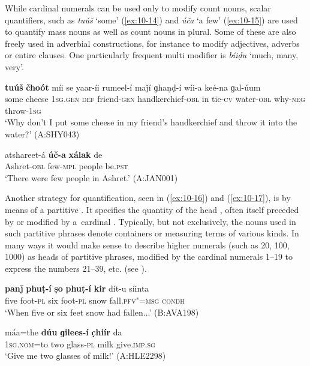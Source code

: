 While cardinal numerals can be used only to modify count nouns, scalar quantifiers, such as \textit{tuúš} `some' (\ref{ex:10-14}) and \textit{úča} `a few' (\ref{ex:10-15}) are used to quantify mass nouns as well as count nouns in plural. Some of these are also freely used in adverbial constructions, for instance to modify adjectives, adverbs or entire clauses. One particularly frequent multi modifier is \textit{bíiḍu} `much, many, very'.

\ea
\label{ex:10-14}
\gll \textbf{tuúš} \textbf{čhoót} míi se yaar-íi rumeel-í maǰí ɡhaṇḍ-í wíi-a keé-na ɡal-úum\\
some cheese \textsc{1sg.gen} \textsc{def} friend-\textsc{gen} handkerchief-\textsc{obl}  in tie-\textsc{cv} water-\textsc{obl} why-\textsc{neg} throw-\textsc{1sg} \\
\glt `Why don't I put some cheese in my friend's handkerchief and throw it into the water?' (A:SHY043)

\ex
\label{ex:10-15}
\gll atshareet-á \textbf{úč-a} \textbf{xálak} de \\
Ashret-\textsc{obl} few-\textsc{mpl} people be.\textsc{pst}\\
\glt `There were few people in Ashret.' (A:JAN001)
\z


Another strategy for quantification, seen in (\ref{ex:10-16}) and (\ref{ex:10-17}), is by means of a partitive  . It specifies the quantity of the head , often itself preceded by or modified by a~cardinal . Typically, but not exclusively, the nouns used in such partitive phrases denote containers or measuring terms of various kinds. In many ways it would make sense to describe higher numerals (such as 20, 100, 1000) as heads of partitive phrases, modified by the cardinal numerals 1--19 to express the numbers 21--39, etc. (see ).

\begin{exe}
\ex
\label{ex:10-16}
\gll \textbf{panǰ} \textbf{phuṭ-í} \textbf{ṣo} \textbf{phuṭ-í} \textbf{kir} dít-u síinta \\
five foot-\textsc{pl} six foot-\textsc{pl} snow fall.\textsc{pfv"=msg} \textsc{condh} \\
\glt `When five or six feet snow had fallen...' (B:AVA198)

\ex
\label{ex:10-17}
\gll máa=the \textbf{dúu} \textbf{ɡilees-í} \textbf{c̣hiír} da \\
\textsc{1sg}.\textsc{nom}=to two glass-\textsc{pl} milk give.\textsc{imp.sg} \\
\glt `Give me two glasses of milk!' (A:HLE2298)
\end{exe}


